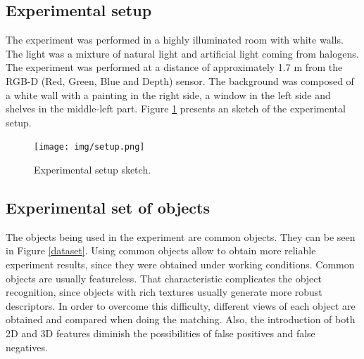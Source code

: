 
	\subsection{Experimental setup}
	\label{setup}
	The experiment was performed in a highly illuminated room with white walls. 
	The light was a mixture of natural light and artificial light coming from halogens.
	The experiment was performed at a distance of approximately 1.7 m from the RGB-D (Red, Green, Blue and Depth) sensor. 
	The background was composed of a white wall with a painting in the right side, a window in the left side and shelves in the middle-left part. 
	Figure \ref{experimental_setup} presents an sketch of the experimental setup. 

	\begin{figure}[H]
		\begin{center}
	    \texttt{[image: img/setup.png]}
		\caption[Experimental setup sketch]{Experimental setup sketch. }
				\label{experimental_setup}

		\end{center}
	\end{figure}



	\subsection{Experimental set of objects}
	\label{set_of_objects}
		The objects being used in the experiment are common objects. 
		They can be seen in Figure \ref{dataset}.
		Using common objects allow to obtain more reliable experiment results, since they were obtained under working conditions. 
		Common objects are usually featureless. 
		That characteristic complicates the object recognition, since objects with rich textures usually generate more robust descriptors.
		In order to overcome this difficulty, different views of each object are obtained and compared when doing the matching. 
		Also, the introduction of both 2D and 3D features diminish the possibilities of false positives and false negatives. 

